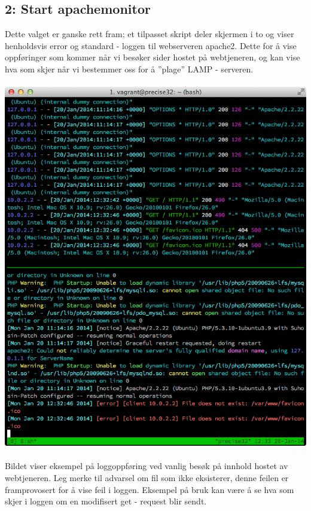 \documentclass{article}
\begin{document}
\subsection{2: Start apachemonitor} 
Dette valget er ganske rett fram; et tilpasset skript deler skjermen i to og viser henholdsvis error og standard - loggen til webserveren apache2. Dette for å vise oppføringer som kommer når vi besøker sider hostet på webtjeneren, og kan vise hva som skjer når vi bestemmer oss for å ''plage'' LAMP - serveren.
\\ \\
\includegraphics[scale= 0.7]{apachelogg.png}
\\ \\
Bildet viser eksempel på loggoppføring ved vanlig besøk på innhold hostet av webtjeneren. Leg merke til advarsel om fil som ikke eksisterer, denne feilen er framprovosert for å vise feil i loggen. Eksempel på bruk kan være å se hva som skjer i loggen om en modifisert get - request blir sendt. 
\end{document}
